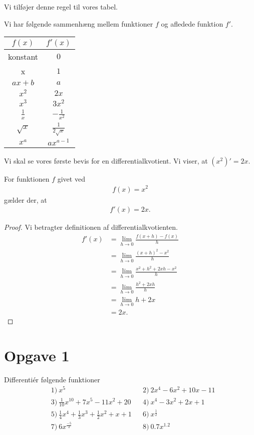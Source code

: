 Vi tilføjer denne regel til vores tabel.
\begin{setn}
Vi har følgende sammenhæng mellem funktioner $f$ og afledede funktion $f'$.
\begin{center}
\begin{tabular}{c|c}
$f(x)$& $f'(x)$\\
\hline
\textnormal{konstant}&$0$\\
\hline
x&$1$\\
\hline
$ax+b$&$a$\\
\hline
$x^2$&$2x$\\
\hline
$x^3$&$3x^2$\\
\hline
$\frac{1}{x}$&$-\frac{1}{x^2}$\\
\hline
$\sqrt{x}$&$\frac{1}{2\sqrt{x}}$\\
\hline
$x^a$ & $ax^{a-1}$
\end{tabular}
\end{center}
\end{setn}

Vi skal se vores første bevis for en differentialkvotient. Vi viser, at $(x^2)' = 2x$. 

\begin{setn}[Differentiation af $x^2$]
	For funktionen $f$ givet ved
	\begin{align*}
		f(x) = x^2
	\end{align*}
	gælder der, at
	\begin{align*}
		f'(x) = 2x.
	\end{align*}
\end{setn}
\begin{proof}
	Vi betragter definitionen af differentialkvotienten.
	\begin{align*}
		f'(x) &= \lim_{h\to 0}\frac{f(x+h)-f(x)}{h}\\
		&= \lim_{h\to 0} \frac{(x+h)^2-x^2}{h}\\
		&= \lim_{h\to 0} \frac{x^2+h^2+2xh-x^2}{h}\\
		&= \lim_{h \to 0} \frac{h^2+2xh}{h}\\
		&=\lim_{h\to 0} h+2x\\
		&= 2x.
	\end{align*}
\end{proof}

\section*{Opgave 1}
Differentiér følgende funktioner
\begin{align*}
	&1) \ x^5   &&2) \ 2x^4-6x^2+10x-11     \\
	&3) \ \frac{1}{10}x^{10}+7x^5-11x^2+20  &&4) \ x^4-3x^2+2x+1     \\ 
	&5) \ \frac{1}{4}x^4 + \frac{1}{3}x^3+\frac{1}{2}x^2+x + 1  &&6) \  x^\frac{1}{2}    \\ 
	&7) \ 6x^{\frac{-5}{2}}  &&8) \  0.7x^{1.2}    \\ 
\end{align*}

